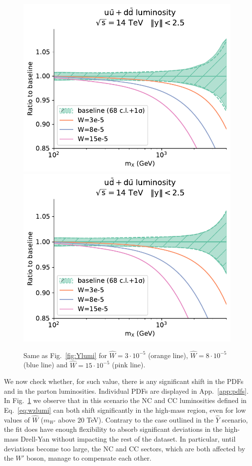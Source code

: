 \documentclass[withindex,glossary]{cam-thesis}
\begin{document}
\begin{figure}[H]
  \includegraphics[width=0.49\linewidth]{Figures/dataspecs1_Lumi_channels0_plot_lumi1d.pdf}
  \includegraphics[width=0.49\linewidth]{Figures/dataspecs1_Lumi_channels1_plot_lumi1d.pdf}
  \caption{Same as Fig.~\ref{fig:Ylumi} for $\hat{W}=3\cdot 10^{-5}$ (orange line),
    $\hat{W}=8\cdot 10^{-5}$ (blue line) and $\hat{W}=15\cdot
    10^{-5}$ (pink line). }
\label{fig:Wlumi}
\end{figure}
%
We now check whether, for such value, there is any significant
shift in the PDFs and in the parton luminosities. Individual PDFs are displayed in App.~\ref{app:pdfs}.
In Fig.~\ref{fig:Wlumi} we observe that in this scenario the
NC and CC luminosities defined in Eq.~\eqref{eq:wzlumi} can both shift significantly in the high-mass region, even for low values of $\hat{W}$ ($m_{W'}$ above 20 TeV).
Contrary to the case outlined in the $\hat{Y}$ scenario, the fit does have enough flexibility to absorb significant deviations in the high-mass Drell-Yan without impacting 
the rest of the dataset. In particular, until deviations become too large, the NC and CC sectors, which are both affected by the $W'$ boson, manage to compensate each other. \\
%
      
\end{document}
